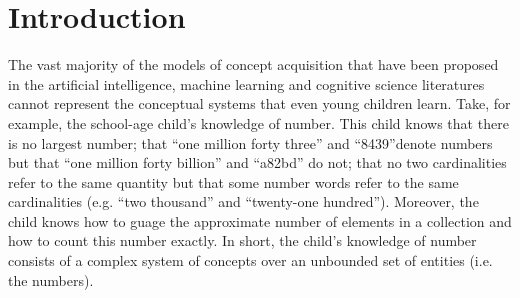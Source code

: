 \documentclass[11pt, twocolumn]{article}
\begin{document}


\section{Introduction}
The vast majority of the models of concept acquisition that have been
proposed in the artificial intelligence, machine learning and
cognitive science literatures cannot represent the conceptual systems
that even young children learn. Take, for example, the school-age
child's knowledge of number. This child knows that there is no largest
number; that ``one million forty three'' and ``8439''denote numbers
but that ``one million forty billion'' and ``a82bd'' do not; that no
two cardinalities refer to the same quantity but that some number
words refer to the same cardinalities (e.g. ``two thousand'' and
``twenty-one hundred''). Moreover, the child knows how to guage the
approximate number of elements in a collection and how to count this
number exactly. In short, the child's knowledge of number consists of
a complex system of concepts over an unbounded set of entities
(i.e. the numbers). 
\end{document}
